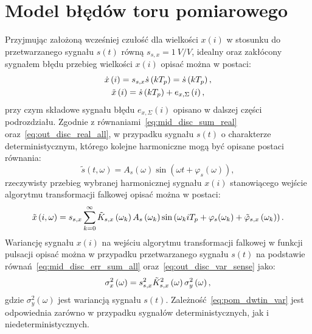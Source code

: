 \section{Model błędów toru pomiarowego}

Przyjmując założoną wcześniej czułość dla wielkości $x(i)$ w stosunku do przetwarzanego sygnału $s(t)$ równą $s_{s,x} = \qty{1}{V \per V}$, idealny oraz zakłócony sygnałem błędu przebieg wielkości $x(i)$ opisać można w postaci:
\begin{gather}
\dot{x} \left(i\right) = s_{s,x} \dot{s} \left(kT_{p}\right) = \dot{s} \left(kT_{p}\right) \label{eq:pom_dwtin_ideal}, \\
\tilde{x} \left(i\right) = \dot{s} \left(kT_{p}\right) + e_{x,\Sigma} \left(i\right) \label{eq:pom_dwtin_real},
\end{gather}
przy czym składowe sygnału błędu $e_{x,\Sigma}(i)$ opisano w dalszej części podrozdziału. Zgodnie z równaniami~\eqref{eq:mid_disc_sum_real} oraz~\eqref{eq:out_disc_real_all}, w przypadku sygnału $s(t)$ o charakterze deterministycznym, którego kolejne harmoniczne mogą być opisane postaci równania:
\begin{equation}
\tilde{s}(t,\omega) = A_{s}(\omega) \sin(\omega t + \varphi_{s}(\omega)) \label{eq:pom_dwtin_harm_ideal},
\end{equation}
rzeczywisty przebieg wybranej harmonicznej sygnału $x(i)$ stanowiącego wejście algorytmu transformacji falkowej opisać można w postaci:
\begin{equation}
\tilde{x} \left(i,\omega\right) =  s_{s,x} \sum_{k = 0} ^{\infty} \tilde{K}_{s,x} \left(\omega_{k}\right) A_{s} \left(\omega_{k}\right) \sin \left(\omega_{k} i T_{p} + \varphi_{s}(\omega_{k}) + \tilde{\varphi}_{s,x} \left(\omega_{k}\right)\right) \label{eq:pom_dwtin_harmsum}.
\end{equation}
Wariancję sygnału $x(i)$ na wejściu algorytmu transformacji falkowej w funkcji pulsacji opisać można w przypadku przetwarzanego sygnału $s(t)$ na podstawie równań~\eqref{eq:mid_disc_err_sum_all} oraz~\eqref{eq:out_disc_var_sense} jako:
\begin{equation}
\sigma_{x}^{2} \left(\omega\right) = s_{s,x}^{2} \tilde{K}_{s,x}^{2} \left(\omega\right) \sigma_{y}^{2} \left(\omega\right) \label{eq:pom_dwtin_var},
\end{equation}
gdzie $\sigma_{y}^{2}(\omega)$ jest wariancją sygnału $s(t)$. Zależność~\eqref{eq:pom_dwtin_var} jest odpowiednia zarówno w przypadku sygnałów deterministycznych, jak i niedeterministycznych.

